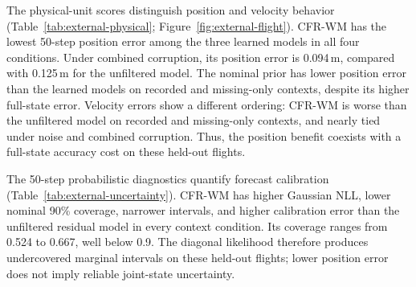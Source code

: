 \documentclass[iicol,pdflatex,sn-basic,Numbered]{sn-jnl}
\newcommand{\ExternalCFRCombinedLongPositionMean}{0.094}
\newcommand{\ExternalUnfilteredCombinedLongPositionMean}{0.125}
\begin{document}
The physical-unit scores distinguish position and velocity behavior
(Table~\ref{tab:external-physical}; Figure~\ref{fig:external-flight}).
CFR-WM has the lowest 50-step position error among the three learned models
in all four conditions. Under combined corruption, its position error is
\ExternalCFRCombinedLongPositionMean{}\,m, compared with
\ExternalUnfilteredCombinedLongPositionMean{}\,m for the unfiltered model.
The nominal prior has lower position error than the learned models on
recorded and missing-only contexts, despite its higher full-state error.
Velocity errors show a different ordering: CFR-WM is worse than the
unfiltered model on recorded and missing-only contexts, and nearly tied
under noise and combined corruption. Thus, the position benefit coexists
with a full-state accuracy cost on these held-out flights.

The 50-step probabilistic diagnostics quantify forecast calibration
(Table~\ref{tab:external-uncertainty}). CFR-WM has higher Gaussian
NLL, lower nominal 90\% coverage, narrower intervals, and higher calibration
error than the unfiltered residual model in every context condition. Its
coverage ranges from 0.524 to 0.667, well below 0.9. The diagonal likelihood
therefore produces undercovered marginal intervals on these held-out flights;
lower position error does not imply reliable joint-state uncertainty.

\begin{table}[t]
\centering
\caption{External flight NRMSE (Equation~\ref{eq:external-score}). Entries
are means $\pm$ SD across five training seeds after equal weighting of three
held-out flights. The nominal forecast is deterministic. All four context
conditions and both horizons are retained.}
\label{tab:external-results}
\end{table}
\end{document}
